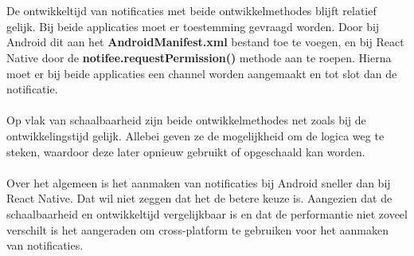 \\\\
De ontwikkeltijd van notificaties met beide ontwikkelmethodes blijft relatief gelijk. 
Bij beide applicaties moet er toestemming gevraagd worden. 
Door bij Android dit aan het \textbf{AndroidManifest.xml} bestand toe te voegen, en bij React Native door 
de \textbf{notifee.requestPermission()} methode aan te roepen. Hierna moet er bij beide applicaties een 
channel worden aangemaakt en tot slot dan de notificatie.
\\\\
Op vlak van schaalbaarheid zijn beide ontwikkelmethodes net zoals bij de ontwikkelingstijd 
gelijk. Allebei geven ze de mogelijkheid om de logica weg te steken, 
waardoor deze later opnieuw gebruikt of opgeschaald kan worden.
\\\\
Over het algemeen is het aanmaken van notificaties bij Android sneller dan bij
React Native. Dat wil niet zeggen dat het de betere keuze is. Aangezien dat de schaalbaarheid
en ontwikkeltijd vergelijkbaar is en dat de performantie niet zoveel verschilt is het 
aangeraden om cross-platform te gebruiken voor het aanmaken van notificaties.
























